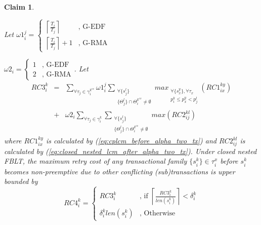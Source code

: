 \documentclass[preprint]{sigplanconf}
\newtheorem{clm}{Claim}
\begin{document}
\begin{clm}\label{clm:closed_nested_lcm_before_delta}

Let $\omega1_{i}^{j}=\begin{cases}
\left\lceil \frac{T_{i}}{T_{j}}\right\rceil  & \mbox{, G-EDF}\\
\left\lceil \frac{T_{i}}{T_{j}}\right\rceil +1 & \mbox{, G-RMA}
\end{cases}$

$\omega2_{i}=\begin{cases}
1 & \mbox{, G-EDF}\\
2 & \mbox{, G-RMA}
\end{cases}$. Let
\begin{eqnarray}
RC3_{i}^{k} & = & \sum_{\forall\tau_{j}\in\gamma_{i}^{k^{ex}}}\omega1_{i}^{j}\sum_{\begin{array}{cc}
\forall\{s_{j}^{l}\}\\
\{\Theta_{j}^{l}\}\cap\Theta_{i}^{k^{ex}}\neq\emptyset
\end{array}}max_{\begin{array}{cc}
\forall\{s_{x}^{y}\},\forall\tau_{x}\\
p_{i}^{k}\le p_{x}^{y}<p_{j}^{l}
\end{array}}\left(RC1_{ix}^{ky}\right)\nonumber \\
 & + & \omega2_{i}\sum_{\forall\tau_{j}\in\gamma_{i}^{k}}\sum_{\begin{array}{cc}
\forall\{s_{j}^{l}\}\\
\{\Theta_{j}^{l}\}\cap\Theta_{i}^{k^{ex}}\neq\emptyset
\end{array}}max\left(RC2_{ij}^{kl}\right)\label{eq:closed_nested_lcm_before_delta}
\end{eqnarray}
where $RC1_{ix}^{ky}$ is calculated by (\ref{eq:cplcm_before_alpha_two_tx})
and $RC2_{ij}^{kl}$ is calculated by (\ref{eq:closed_nested_lcm_after_alpha_two_tx}).
Under closed nested FBLT, the maximum retry cost of any transactional
family $\{s_{i}^{k}\}\in\tau_{i}^{x}$ before $s_{i}^{k}$ becomes
non-preemptive due to other conflicting (sub)transactions is upper
bounded by 
\begin{equation}
RC4_{i}^{k}=\begin{cases}
RC3_{i}^{k} & \mbox{, if }\left\lceil \frac{RC3_{i}^{k}}{len\left(s_{i}^{k}\right)}\right\rceil <\delta_{i}^{k}\\
\delta_{i}^{k}len\left(s_{i}^{k}\right) & \mbox{, Otherwise}
\end{cases}\label{eq:closed_nested_fblt_before_delta}
\end{equation}

\end{clm}
\end{document}
